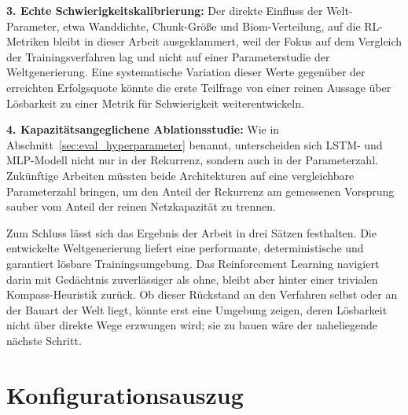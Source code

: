 \documentclass[
  a4paper,
  11pt,
  twoside,
  BCOR=8mm,           %
  headings=big,
  numbers=noenddot,
  listof=totoc,       %
  captions=tableheading,
]{scrreprt}
\begin{document}
\textbf{3. Echte Schwierigkeitskalibrierung:} Der direkte Einfluss der Welt-Parameter, etwa Wanddichte, Chunk-Größe und Biom-Verteilung, auf die RL-Metriken bleibt in dieser Arbeit ausgeklammert, weil der Fokus auf dem Vergleich der Trainingsverfahren lag und nicht auf einer Parameterstudie der Weltgenerierung. Eine systematische Variation dieser Werte gegenüber der erreichten Erfolgsquote könnte die erste Teilfrage von einer reinen Aussage über Lösbarkeit zu einer Metrik für Schwierigkeit weiterentwickeln.

\textbf{4. Kapazitätsangeglichene Ablationsstudie:} Wie in Abschnitt~\ref{sec:eval_hyperparameter} benannt, unterscheiden sich LSTM- und MLP-Modell nicht nur in der Rekurrenz, sondern auch in der Parameterzahl. Zukünftige Arbeiten müssten beide Architekturen auf eine vergleichbare Parameterzahl bringen, um den Anteil der Rekurrenz am gemessenen Vorsprung sauber vom Anteil der reinen Netzkapazität zu trennen.

\bigskip
Zum Schluss lässt sich das Ergebnis der Arbeit in drei Sätzen festhalten. Die entwickelte Weltgenerierung liefert eine performante, deterministische und garantiert lösbare Trainingsumgebung. Das Reinforcement Learning navigiert darin mit Gedächtnis zuverlässiger als ohne, bleibt aber hinter einer trivialen Kompass-Heuristik zurück. Ob dieser Rückstand an den Verfahren selbst oder an der Bauart der Welt liegt, könnte erst eine Umgebung zeigen, deren Lösbarkeit nicht über direkte Wege erzwungen wird; sie zu bauen wäre der naheliegende nächste Schritt.


\clearpage
{}
{}


\appendix

\chapter{Konfigurationsauszug}
\label{chap:anhang_config}
\end{document}
